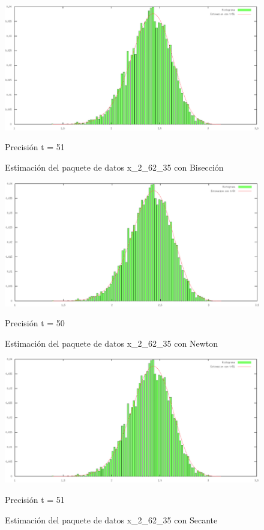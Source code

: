 \documentclass[10pt, a4paper]{article}
\begin{document}
\begin{figure}[H] %
\begin{center}
\includegraphics[width=370pt]{./Biseccion_51.png}
\caption[h]{Estimaci\'on del paquete de datos x\_2\_62\_35 con Bisecci\'on}{Precisi\'on t = 51}
\end{center}
\end{figure}

\begin{figure}[H] %
\begin{center}
\includegraphics[width=370pt]{./Newton_50.png}
\caption[h]{Estimaci\'on del paquete de datos x\_2\_62\_35 con Newton}{Precisi\'on t = 50}
\end{center}
\end{figure}

\begin{figure}[H] %
\begin{center}
\includegraphics[width=370pt]{./Secante_51.png}
\caption[h]{Estimaci\'on del paquete de datos x\_2\_62\_35 con Secante}{Precisi\'on t = 51}
\end{center}
\end{figure}
\end{document}
